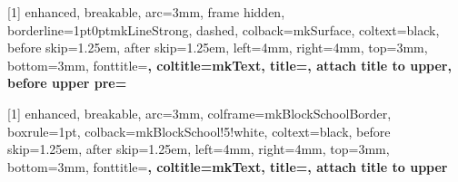 
[1]{
  enhanced,
  breakable,
  arc=3mm,
  frame hidden,
  borderline={1pt}{0pt}{mkLineStrong, dashed},
  colback=mkSurface,
  coltext=black,
  before skip=1.25em,
  after skip=1.25em,
  left=4mm, right=4mm, top=3mm, bottom=3mm,
  fonttitle=\bfseries,
  coltitle=mkText,
  title={},
  attach title to upper,
  before upper pre=\mkFloatsHere
}

[1]{
  enhanced,
  breakable,
  arc=3mm,
  colframe=mkBlockSchoolBorder,
  boxrule=1pt,
  colback=mkBlockSchool!5!white,
  coltext=black,
  before skip=1.25em,
  after skip=1.25em,
  left=4mm, right=4mm, top=3mm, bottom=3mm,
  fonttitle=\bfseries,
  coltitle=mkText, 
  title={},
  attach title to upper
}
